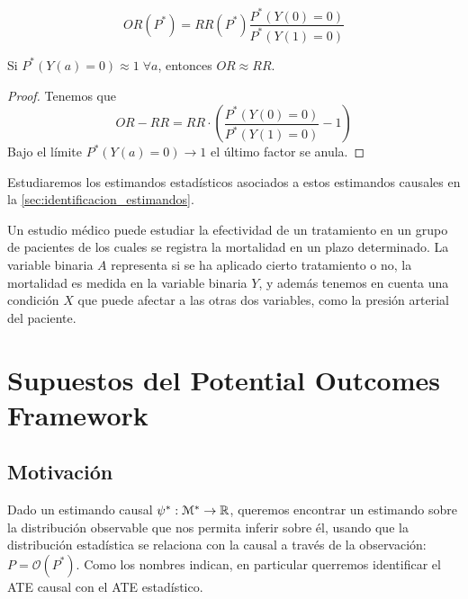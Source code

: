\begin{corolario}
    \[
        OR(P^*) = RR(P^*) \dfrac{P^*(Y(0) = 0)}{P^*(Y(1) = 0)}
    \]
\end{corolario}

\begin{corolario}[Caso de enfermedad rara] %
    Si $P^*(Y(a) = 0) \approx 1 \; \forall a$, entonces $OR \approx RR$.
\end{corolario}
\begin{proof}
    Tenemos que
    \[
        OR - RR = RR \cdot \left(\dfrac{P^*(Y(0) = 0)}{P^*(Y(1) = 0)} - 1\right)
    \]
    Bajo el límite $P^*(Y(a) = 0) \to 1$
    el último factor se anula.
\end{proof}

Estudiaremos los estimandos estadísticos asociados a estos estimandos causales
en la \autoref{sec:identificacion_estimandos}.

\begin{ejemplo} %
    Un estudio médico puede estudiar la efectividad de un tratamiento en un
    grupo de pacientes de los cuales se registra la mortalidad en un plazo determinado.
    La variable binaria $A$ representa si se ha aplicado cierto tratamiento o no,
    la mortalidad es medida en la variable binaria $Y$,
    y además tenemos en cuenta una condición $X$ que puede afectar a las otras
    dos variables, como la presión arterial del paciente.
\end{ejemplo}


\section{Supuestos del Potential Outcomes Framework}
\cite[capítulo 2.2]{mci}

\subsection{Motivación}
Dado un estimando causal $\psi^* : \mathcal{M}^* \to \mathbb{R}$, queremos encontrar
un estimando sobre la distribución observable que nos permita inferir sobre él,
usando que la distribución estadística se relaciona con la causal a través de
la observación: $P = \mathcal{O}(P^*)$.
Como los nombres indican, en particular querremos identificar el ATE causal con el ATE estadístico.

